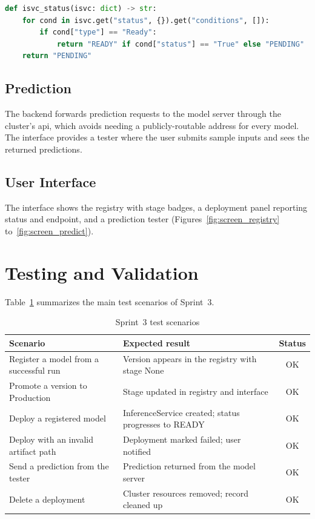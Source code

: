 \begin{lstlisting}[language=Python,caption={Reading readiness from the InferenceService status conditions.},label={lst:isvc-status}]
def isvc_status(isvc: dict) -> str:
    for cond in isvc.get("status", {}).get("conditions", []):
        if cond["type"] == "Ready":
            return "READY" if cond["status"] == "True" else "PENDING"
    return "PENDING"
\end{lstlisting}

\subsection{Prediction}
The backend forwards prediction requests to the model server through the cluster's
\gls{api}, which avoids needing a publicly-routable address for every model. The
interface provides a tester where the user submits sample inputs and sees the
returned predictions.

\subsection{User Interface}
The interface shows the registry with stage badges, a deployment panel reporting
status and endpoint, and a prediction tester
(Figures~\ref{fig:screen_registry} to~\ref{fig:screen_predict}).

\section{Testing and Validation}
Table~\ref{tab:tests-s3} summarizes the main test scenarios of Sprint~3.

\begin{table}[H]\centering
\renewcommand{\arraystretch}{1.25}
\caption{Sprint~3 test scenarios}\label{tab:tests-s3}
\begin{tabularx}{\textwidth}{|X|X|c|}
\hline
\textbf{Scenario} & \textbf{Expected result} & \textbf{Status}\\
\hline
Register a model from a successful run & Version appears in the registry with stage None & OK\\ \hline
Promote a version to Production & Stage updated in registry and interface & OK\\ \hline
Deploy a registered model & InferenceService created; status progresses to READY & OK\\ \hline
Deploy with an invalid artifact path & Deployment marked failed; user notified & OK\\ \hline
Send a prediction from the tester & Prediction returned from the model server & OK\\ \hline
Delete a deployment & Cluster resources removed; record cleaned up & OK\\ \hline
\end{tabularx}
\end{table}


